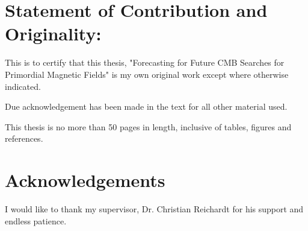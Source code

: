 \section*{Statement of Contribution and Originality:}

This is to certify that this thesis, "Forecasting for Future CMB Searches for Primordial Magnetic Fields" is my own original work except where otherwise indicated.

Due acknowledgement has been made in the text for all other material used.

This thesis is no more than 50 pages in length, inclusive of tables, figures and references.

\section*{Acknowledgements}

I would like to thank my supervisor, Dr. Christian Reichardt for his support and endless patience.